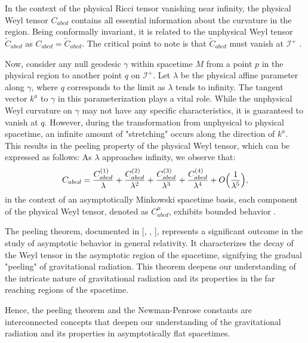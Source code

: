 In the context of the physical Ricci tensor vanishing near infinity, the physical Weyl tensor $C_{abcd}$ contains all essential information about the curvature in the region. Being conformally invariant, it is related to the unphysical Weyl tensor $\tilde{C}_{abcd}$ as $C_{abcd} = \tilde{C}_{abcd}$. The critical point to note is that $\tilde{C}_{abcd}$ must vanish at $\mathscr{I}^+$ \cite{Wal84a}. 

Now, consider any null geodesic $\gamma$ within spacetime $M$ from a point $p$ in the physical region to another point $q$ on $\mathscr{I}^+$. Let $\lambda$ be the physical affine parameter along $\gamma$, where $q$ corresponds to the limit as $\lambda$ tends to infinity. The tangent vector $k^{a}$ to $\gamma$ in this parameterization plays a vital role. While the unphysical Weyl curvature on $\gamma$ may not have any specific characteristics, it is guaranteed to vanish at $q$. However, during the transformation from unphysical to physical spacetime, an infinite amount of "stretching" occurs along the direction of $k^{a}$. This results in the peeling property of the physical Weyl tensor, which can be expressed as follows: As $\lambda$ approaches infinity, we observe that:
\begin{equation}\label{eq:peeling}
  C_{a b c d}=\frac{C_{a b c d}^{(1)}}{\lambda}+\frac{C_{a b c d}^{(2)}}{\lambda^{2}}+\frac{C_{a b c d}^{(3)}}{\lambda^{3}}+\frac{C_{a b c d}^{(4)}}{\lambda^{4}}+O\Bigl(\frac{1}{\lambda^{5}}\Bigr),
\end{equation}
in the context of an asymptotically Minkowski spacetime basis, each component of the physical Weyl tensor, denoted as $C_{abcd}^{\mu}$, exhibits bounded behavior \cite{Wal84a}. 

The peeling theorem, documented in [\cite{Sac61}, \cite{BonBurMet62}, \cite{NewPen62}], represents a significant outcome in the study of asymptotic behavior in general relativity. It characterizes the decay of the Weyl tensor in the asymptotic region of
the spacetime, signifying the gradual "peeling" of gravitational radiation. This theorem deepens our understanding of the intricate nature of gravitational radiation and its properties in the far reaching regions of the spacetime.

Hence, the peeling theorem and the Newman-Penrose constants are interconnected concepts that deepen our
understanding of the gravitational radiation and its properties in asymptotically flat spacetimes.
